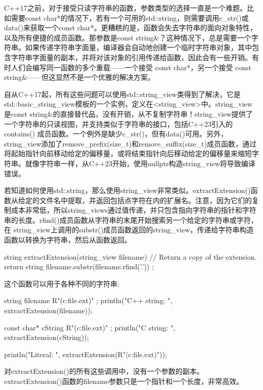 C++17之前，对于接受只读字符串的函数，参数类型的选择一直是一个难题。比如需要const char*的情况下，若有一个可用的std::string，则需要调用c\_str()或data()来获取一个const char*。更糟糕的是，函数会失去字符串的面向对象特性，以及所有便捷的成员函数。那参数是const string\&？这种情况下，总是需要一个字符串。如果传递字符串字面量，编译器会自动地创建一个临时字符串对象，其中包含字符串字面量的副本，并将对该对象的引用传递给函数，因此会有一些开销。有时人们会编写同一函数的多个重载——一个接受 const char*，另一个接受 const string\&——但这显然不是一个优雅的解决方案。

自从C++17起，所有这些问题可以使用std::string\_view类得到了解决，它是std::basic\_string\_view模板的一个实例，定义在<string\_view>中。string\_view 是const string\&的直接替代品，没有开销，从不复制字符串！string\_view提供了一个字符串的只读视图，并支持类似于字符串的接口，包括C++23引入的contains() 成员函数。一个例外是缺少c\_str()，但有data()可用。另外，string\_view添加了remove\_prefix(size\_t)和remove\_suffix(size\_t)成员函数，通过将起始指针向前移动给定的偏移量，或将结束指针向后移动给定的偏移量来缩短字符串。就像字符串一样，从C++23开始，使用nullptr构造string\_view将导致编译错误。

若知道如何使用std::string，那么使用string\_view非常类似。extractExtension()函数从给定的文件名中提取，并返回包括点字符在内的扩展名。注意，因为它们的复制成本非常低，所以string\_views通过值传递，并只包含指向字符串的指针和字符串的长度。rfind()成员函数从字符串的末尾开始搜索另一个给定的字符串或字符，在 string\_view上调用的substr()成员函数返回的string\_view，传递给字符串构造函数以转换为字符串，然后从函数返回。

\begin{cpp}
string extractExtension(string_view filename)
{
    // Return a copy of the extension.
    return string { filename.substr(filename.rfind('.')) };
}
\end{cpp}

这个函数可以用于各种不同的字符串:

\begin{cpp}
string filename { R"(c:\temp\my file.ext)" };
println("C++ string: {}", extractExtension(filename));

const char* cString { R"(c:\temp\my file.ext)" };
println("C string: {}", extractExtension(cString));

println("Literal: {}", extractExtension(R"(c:\temp\my file.ext)"));
\end{cpp}

对extractExtension()的所有这些调用中，没有一个参数的副本。extractExtension()函数的filename参数只是一个指针和一个长度，非常高效。

